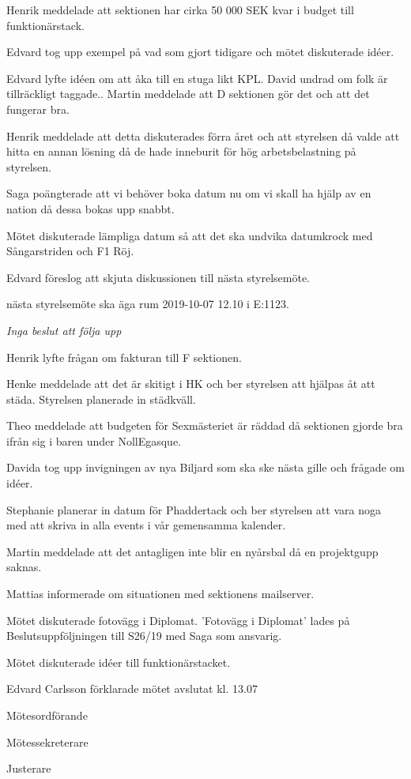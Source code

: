 \documentclass[10pt]{article}
\def\mo{Edvard Carlsson}
\def\ms{Mattias Lundström}
\def\ji{Henrik Ramström}
\begin{document}
\begin{paragrafer}
\Mbaby



Henrik meddelade att sektionen har cirka 50 000 SEK kvar i budget till funktionärstack. 

Edvard tog upp exempel på vad som gjort tidigare och mötet diskuterade idéer. 

Edvard lyfte idéen om att åka till en stuga likt KPL. David undrad om folk är tillräckligt taggade.. Martin meddelade att D sektionen gör det och att det fungerar bra. 

Henrik meddelade att detta diskuterades förra året och att styrelsen då valde att hitta en annan lösning då de hade inneburit för hög arbetsbelastning på styrelsen. 

Saga poängterade att vi behöver boka datum nu om vi skall ha hjälp av en nation då dessa bokas upp snabbt. 

Mötet diskuterade lämpliga datum så att det ska undvika datumkrock med Sångarstriden och F1 Röj. 

Edvard föreslog att skjuta diskussionen till nästa styrelsemöte. 

\Mba nästa styrelsemöte ska äga rum 2019-10-07 12.10 i E:1123.

\textit{Inga beslut att följa upp}

Henrik lyfte frågan om fakturan till F sektionen.

Henke meddelade att det är skitigt i HK och ber styrelsen att hjälpas åt att städa. Styrelsen planerade in städkväll.

Theo meddelade att budgeten för Sexmästeriet är räddad då sektionen gjorde bra ifrån sig i baren under NollEgasque.

Davida tog upp invigningen av nya Biljard som ska ske nästa gille och frågade om idéer.

Stephanie planerar in datum för Phaddertack och ber styrelsen att vara noga med att skriva in alla events i vår gemensamma kalender. 

Martin meddelade att det antagligen inte blir en nyårsbal då en projektgupp saknas. 

Mattias informerade om situationen med sektionens mailserver. 

Mötet diskuterade fotovägg i Diplomat. 'Fotovägg i Diplomat' lades på Beslutsuppföljningen till S26/19 med Saga som ansvarig. 

Mötet diskuterade idéer till funktionärstacket. 

{\mo} förklarade mötet avslutat kl. 13.07
\end{paragrafer}

\hidesignfoot
\begin{signatures}{3}
\signature{\mo}{Mötesordförande}
\signature{\ms}{Mötessekreterare}
\signature{\ji}{Justerare}
\end{signatures}
\end{document}
